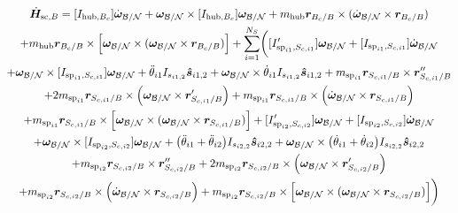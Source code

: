 \documentclass[paper]{aiaaNew}
\begin{document}
	\begin{multline}
	\dot{\bm{H}}_{\text{sc},B} = [I_{\text{hub},B_c}] \dot{\bm\omega}_{\cal B/N} + \bm\omega_{\cal B/N} \times [I_{\text{hub},B_c}] \bm\omega_{\cal B/N} + m_{\text{hub}} \bm{r}_{B_c/B}\times ( \dot{\bm\omega}_{\cal B/N}\times \bm{r}_{B_c/B}) \\+ m_{\text{hub}} \bm{r}_{B_c/B}\times\Big[\bm\omega_{\cal B/N} \times (\bm\omega_{\cal B/N} \times \bm{r}_{B_c/B})\Big] +\sum\limits_{i=1}^{N_S} \biggl( [I'_{\text{sp}_{i1},S_{c,i1}}] \bm\omega_{\cal B/N} + [I_{\text{sp}_{i1},S_{c,i1}}] \dot{\bm\omega}_{\cal B/N} \\+ \bm\omega_{\cal B/N} \times [I_{\text{sp}_{i1},S_{c,i1}}] \bm\omega_{\cal B/N} 
	+ \ddot{\theta}_{i1} I_{s_{i1,2}}\bm{\hat{s}}_{i1,2}+ \bm\omega_{\cal B/N} \times \dot{\theta}_{i1} I_{s_{i1,2}}\bm{\hat{s}}_{i1,2} 
	+m_{\text{sp}_{i1}} \bm{r}_{S_{c,i1}/B} \times \bm{r}''_{S_{c,i1}/B}\\ + 2 m_{\text{sp}_{i1}} \bm{r}_{S_{c,i1}/B} \times \Big( \bm\omega_{\cal B/N} \times \bm{r}'_{S_{c,i1}/B}\Big)
	+m_{\text{sp}_{i1}} \bm{r}_{S_{c,i1}/B} \times \Big( \dot{\bm\omega}_{\cal B/N} \times \bm{r}_{S_{c,i1}/B}\Big) \\+m_{\text{sp}_{i1}} \bm{r}_{S_{c,i1}/B} \times \Big[ \bm\omega_{\cal B/N} \times (\bm\omega_{\cal B/N} \times \bm{r}_{S_{c,i1}/B})\Big]
	+ [I'_{\text{sp}_{i2},S_{c,i2}}] \bm\omega_{\cal B/N} + [I_{\text{sp}_{i2},S_{c,i2}}] \dot{\bm\omega}_{\cal B/N} \\+ \bm\omega_{\cal B/N} \times [I_{\text{sp}_{i2},S_{c,i2}}] \bm\omega_{\cal B/N} 
	+ \big(\ddot{\theta}_{i1} + \ddot{\theta}_{i2}\big) I_{s_{i2,2}}\bm{\hat{s}}_{i2,2}+ \bm\omega_{\cal B/N} \times \big(\dot{\theta}_{i1} + \dot{\theta}_{i2}\big) I_{s_{i2,2}}\bm{\hat{s}}_{i2,2} \\
	+m_{\text{sp}_{i2}} \bm{r}_{S_{c,i2}/B} \times \bm{r}''_{S_{c,i2}/B} + 2 m_{\text{sp}_{i2}} \bm{r}_{S_{c,i2}/B} \times \Big(\bm\omega_{\cal B/N} \times \bm{r}'_{S_{c,i2}/B}\Big)\\
	 +m_{\text{sp}_{i2}} \bm{r}_{S_{c,i2}/B} \times \Big(\dot{\bm\omega}_{\cal B/N} \times \bm{r}_{S_{c,i2}/B}\Big) +m_{\text{sp}_{i2}} \bm{r}_{S_{c,i2}/B} \times \Big[\bm\omega_{\cal B/N} \times (\bm\omega_{\cal B/N} \times \bm{r}_{S_{c,i2}/B})\Big]\biggr)
	\label{eq:Hbdot3}
\end{multline}	
\end{document}
